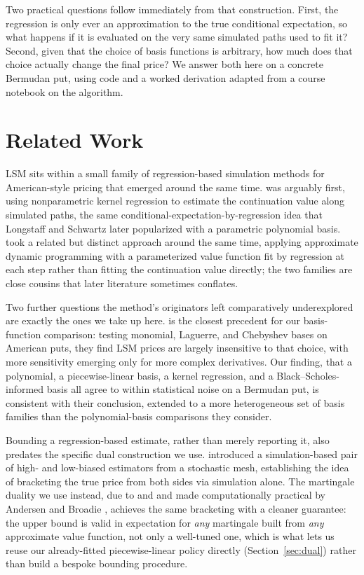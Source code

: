 \documentclass[11pt]{article}
\begin{document}
Two practical questions follow immediately from that construction. First, the regression is only ever an approximation to the true conditional expectation, so what happens if it is evaluated on the very same simulated paths used to fit it? Second, given that the choice of basis functions is arbitrary, how much does that choice actually change the final price? We answer both here on a concrete Bermudan put, using code and a worked derivation adapted from a course notebook on the algorithm.

\section{Related Work}
\label{sec:related}

LSM sits within a small family of regression-based simulation methods for American-style pricing that emerged around the same time. \cite{carriere1996} was arguably first, using nonparametric kernel regression to estimate the continuation value along simulated paths, the same conditional-expectation-by-regression idea that Longstaff and Schwartz \cite{longstaffschwartz2001} later popularized with a parametric polynomial basis. \cite{tsitsiklisvanroy2001} took a related but distinct approach around the same time, applying approximate dynamic programming with a parameterized value function fit by regression at each step rather than fitting the continuation value directly; the two families are close cousins that later literature sometimes conflates.

Two further questions the method's originators left comparatively underexplored are exactly the ones we take up here. \cite{morenonavas2003} is the closest precedent for our basis-function comparison: testing monomial, Laguerre, and Chebyshev bases on American puts, they find LSM prices are largely insensitive to that choice, with more sensitivity emerging only for more complex derivatives. Our finding, that a polynomial, a piecewise-linear basis, a kernel regression, and a Black--Scholes-informed basis all agree to within statistical noise on a Bermudan put, is consistent with their conclusion, extended to a more heterogeneous set of basis families than the polynomial-basis comparisons they consider.

Bounding a regression-based estimate, rather than merely reporting it, also predates the specific dual construction we use. \cite{broadieglasserman1997} introduced a simulation-based pair of high- and low-biased estimators from a stochastic mesh, establishing the idea of bracketing the true price from both sides via simulation alone. The martingale duality we use instead, due to \cite{rogers2002} and \cite{haughkogan2004} and made computationally practical by Andersen and Broadie \cite{andersenbroadie2004}, achieves the same bracketing with a cleaner guarantee: the upper bound is valid in expectation for \emph{any} martingale built from \emph{any} approximate value function, not only a well-tuned one, which is what lets us reuse our already-fitted piecewise-linear policy directly (Section~\ref{sec:dual}) rather than build a bespoke bounding procedure.
\end{document}
